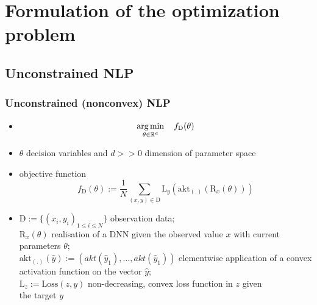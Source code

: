 


\beamertemplatenavigationsymbolsempty{}




\section{Formulation of the optimization problem}

   \subsection{Unconstrained NLP}
   
   \begin{frame}
   \frametitle{Unconstrained (nonconvex) NLP}
   \begin{itemize}
   	\item[] $$\operatorname*{arg\,min}_{\theta\in\mathbb{R}^{d}}\quad f_{\mathrm{D}}(\theta)$$
   	\item $\theta$ decision variables and $d>>0$ dimension of parameter space
   	\item objective function
   	$$f_{\mathrm{D}}(\theta) := \frac{1}{N}\sum_{(x, y)\in\mathrm{D}}^{}\mathrm{L}_{y}(\text{akt}_{(.)}(\mathrm{R}_{x}(\theta)))$$
   	\pause
   	\item $\mathrm{D} := \{(x_{i}, y_{i})_{1\leq i\leq N}\}$ observation data;\\ 
   	$\mathrm{R}_{x}(\theta)$ realisation of a DNN given the observed value $x$ with current parameters $\theta$;\\
   	$\text{akt}_{(.)}(\hat{y}) := \left(akt(\hat{y}_{1}), \ldots, akt(\hat{y}_{1})\right)$ elementwise application of a convex activation function on the vector $\hat{y}$;\\
   	$\mathrm{L}_{z} := \text{Loss}(z, y)$ non-decreasing, convex loss function in $z$ given \\ the target $y$
   \end{itemize}
  \end{frame}
